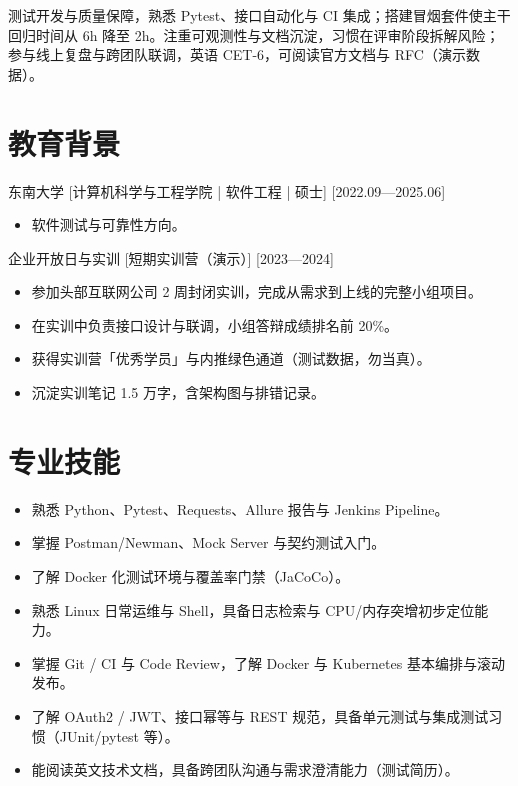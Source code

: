 \documentclass{resume-photo}
\begin{document}

\ResumeTitle

\noindent 测试开发与质量保障，熟悉 Pytest、接口自动化与 CI 集成；搭建冒烟套件使主干回归时间从 6h 降至 2h。注重可观测性与文档沉淀，习惯在评审阶段拆解风险；参与线上复盘与跨团队联调，英语 CET-6，可阅读官方文档与 RFC（演示数据）。

\section{教育背景}
\ResumeItem
{东南大学}
[\textnormal{计算机科学与工程学院 | 软件工程 | 硕士}]
[2022.09—2025.06]

\begin{itemize}
  \item 软件测试与可靠性方向。
\end{itemize}


\ResumeItem
{企业开放日与实训}
[\textnormal{短期实训营（演示）}]
[2023—2024]

\begin{itemize}
  \item 参加头部互联网公司 2 周封闭实训，完成从需求到上线的完整小组项目。
  \item 在实训中负责接口设计与联调，小组答辩成绩排名前 20\%。
  \item 获得实训营「优秀学员」与内推绿色通道（测试数据，勿当真）。
  \item 沉淀实训笔记 1.5 万字，含架构图与排错记录。
\end{itemize}



\section{专业技能}
\begin{itemize}
  \item 熟悉 Python、Pytest、Requests、Allure 报告与 Jenkins Pipeline。
  \item 掌握 Postman/Newman、Mock Server 与契约测试入门。
  \item 了解 Docker 化测试环境与覆盖率门禁（JaCoCo）。
  \item 熟悉 Linux 日常运维与 Shell，具备日志检索与 CPU/内存突增初步定位能力。
  \item 掌握 Git / CI 与 Code Review，了解 Docker 与 Kubernetes 基本编排与滚动发布。
  \item 了解 OAuth2 / JWT、接口幂等与 REST 规范，具备单元测试与集成测试习惯（JUnit/pytest 等）。
  \item 能阅读英文技术文档，具备跨团队沟通与需求澄清能力（测试简历）。
\end{itemize}
\end{document}
